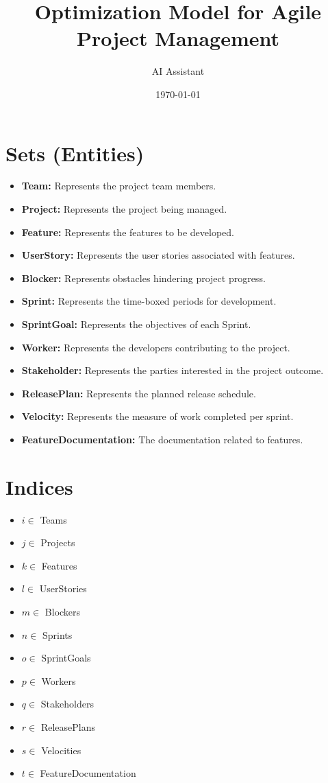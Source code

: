 \documentclass{article}
\title{Optimization Model for Agile Project Management}
\author{AI Assistant}
\date{\today}
\begin{document}
\maketitle

\tableofcontents

\newpage

\section{Sets (Entities)}

\begin{itemize}
    \item \textbf{Team:} Represents the project team members.
    \item \textbf{Project:} Represents the project being managed.
    \item \textbf{Feature:} Represents the features to be developed.
    \item \textbf{UserStory:} Represents the user stories associated with features.
    \item \textbf{Blocker:} Represents obstacles hindering project progress.
    \item \textbf{Sprint:} Represents the time-boxed periods for development.
    \item \textbf{SprintGoal:} Represents the objectives of each Sprint.
    \item \textbf{Worker:} Represents the developers contributing to the project.
    \item \textbf{Stakeholder:} Represents the parties interested in the project outcome.
    \item \textbf{ReleasePlan:} Represents the planned release schedule.
    \item \textbf{Velocity:} Represents the measure of work completed per sprint.
    \item \textbf{FeatureDocumentation:} The documentation related to features.
\end{itemize}

\section{Indices}

\begin{itemize}
    \item $i \in$ Teams
    \item $j \in$ Projects
    \item $k \in$ Features
    \item $l \in$ UserStories
    \item $m \in$ Blockers
    \item $n \in$ Sprints
    \item $o \in$ SprintGoals
    \item $p \in$ Workers
    \item $q \in$ Stakeholders
    \item $r \in$ ReleasePlans
    \item $s \in$ Velocities
    \item $t \in$ FeatureDocumentation
\end{itemize}
\end{document}
